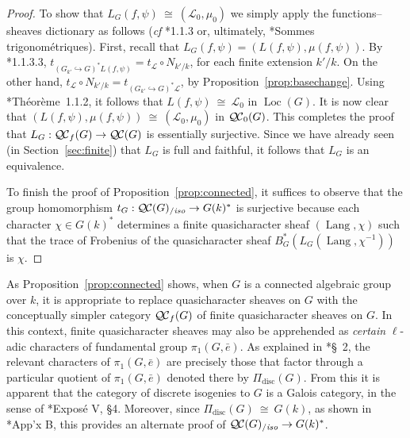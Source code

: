 \documentclass[11pt]{amsart}
\theoremstyle{plain}
\theoremstyle{definition}
\theoremstyle{remark}
\newcommand{\bFq}{\bar{k}}
\newcommand{\Fq}{k}
\DeclareMathOperator{\Gal}{Gal}
\newcommand{\iso}{{\ \cong\ }}
\newcommand{\cs}[1]{{\mathcal{#1}}}
\newcommand{\QC}{{\mathcal{Q\hskip-0.8pt C}}}
\newcommand{\QCb}{{\QC_0}}
\newcommand{\QCf}{{\QC_f}}
\newcommand{\QCiso}[1]{\QC(#1)_{/\textit{iso}}}
\newcommand{\Lang}{{\operatorname{Lang}}}
\newcommand{\Loc}{{\operatorname{Loc}}}
\newcommand{\trFrob}[1]{t_{#1}}
\begin{document}
\begin{proof}
  To show that $L_G(f,\psi) \iso (\cs{L}_0,\mu_0)$ we simply apply the functions--sheaves dictionary
  as follows ({\it cf} \cite{laumon:87a}*{1.1.3} or, ultimately, \cite{deligne:SGA4.5}*{Sommes trigonométriques}).
  First, recall that $L_G(f,\psi) = (L(f,\psi), \mu(f,\psi))$. 
  By  \cite{laumon:87a}*{1.1.3.3}, $\trFrob{(G_{k'}\hookrightarrow G)^*L(f,\psi)} = \trFrob{\cs{L}} \circ N_{k'/k}$, for each finite extension $k'/k$.
  On the other hand, $\trFrob{\cs{L}} \circ N_{k'/k} = \trFrob{(G_{k'}\hookrightarrow G)^*\cs{L}}$,  by Proposition~\ref{prop:basechange}.
  Using \cite{laumon:87a}*{Th\'eor\`eme~1.1.2}, it follows that  $L(f,\psi) \iso \cs{L}_0$ in $\Loc(G)$.
  It is now clear that $(L(f,\psi),\mu(f,\psi)) \iso (\cs{L}_0,\mu_0)$ in $\QCb(G)$.
  This completes the proof that $L_G : \QCf(G) \to \QC(G)$ is essentially surjective.
  Since we have already seen (in Section~\ref{sec:finite}) that $L_G$ is full and faithful, 
  it follows that $L_G$ is an equivalence.
  
  To finish the proof of Proposition~\ref{prop:connected}, it suffices to observe that the group homomorphism
  $
  \trFrob{G} : \QCiso{G} \to G(\Fq)^*
  $
  is surjective because each character $\chi \in G(\Fq)^*$ determines a finite quasicharacter sheaf $(\Lang,\chi)$ such that the trace of Frobenius of the quasicharacter sheaf $B_G^* (L_G(\Lang,\chi^{-1}))$ is $\chi$.
\end{proof}

As Proposition~\ref{prop:connected} shows, 
when $G$ is a connected algebraic group over $\Fq$, 
it is appropriate to replace quasicharacter sheaves on $G$ 
with the conceptually simpler category $\QCf(G)$ of finite quasicharacter sheaves on $G$. 
In this context, finite quasicharacter sheaves may also be apprehended as \emph{certain} $\ell$-adic characters of fundamental group $\pi_1(G,{\bar e})$. 
As explained in \cite{kamgarpour:09a}*{\S~2}, 
the relevant characters of $\pi_1(G,{\bar e})$ are precisely those 
that factor through a particular quotient of $\pi_1(G,{\bar e})$ 
denoted there by $\Pi_\text{disc}(G)$.
From this it is apparent that the category of discrete isogenies to $G$ is a Galois category, in the sense of \cite{grothendieck:SGA1}*{Expos\'e V, \S 4}. Moreover, since $\Pi_\text{disc}(G) \iso G(\Fq)$, as shown in \cite{kamgarpour:09a}*{App'x B}, this provides an alternate proof of $\QCiso{G} \to G(\Fq)^*$.
\end{document}
